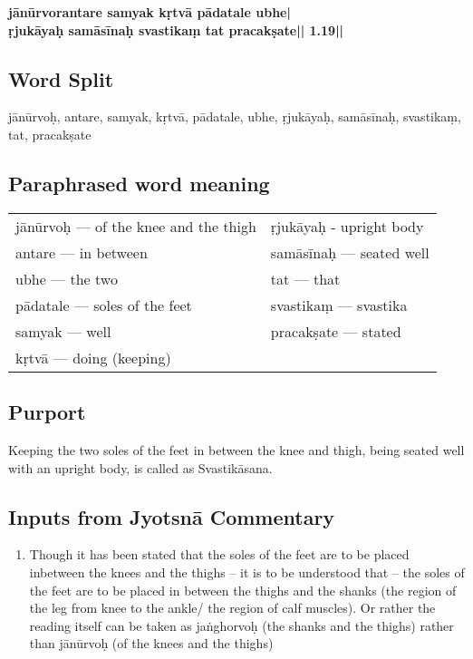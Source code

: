 \begin{shloka}
\textbf{jānūrvorantare samyak kṛtvā pādatale ubhe|}\\
\textbf{ṛjukāyaḥ samāsīnaḥ svastikaṃ tat pracakṣate|| 1.19||}
\end{shloka}

\subsection*{Word Split}

jānūrvoḥ, antare, samyak, kṛtvā, pādatale, ubhe, ṛjukāyaḥ, samāsīnaḥ, svastikaṃ, tat, pracakṣate
\vspace{-5pt}

\subsection*{Paraphrased word meaning}
\vspace{-10pt}

\begin{longtable}{>{\noindent\raggedright}p{5cm}>{\noindent\raggedright}p{5cm}}
jānūrvoḥ --- of the knee and the thigh & ṛjukāyaḥ - upright body\tabularnewline
antare --- in  between & samāsīnaḥ --- seated well\tabularnewline
ubhe --- the two & tat --- that\tabularnewline
pādatale --- soles of the feet & svastikaṃ --- svastika\tabularnewline
samyak --- well & pracakṣate --- stated\tabularnewline
kṛtvā --- doing (keeping) & 
\end{longtable}
\vspace{-5pt}

\subsection*{Purport}
\vspace{-10pt}

Keeping the two soles of the feet in between the knee and thigh, being seated well with an upright body, is called as Svastikāsana.

\subsection*{Inputs from Jyotsnā Commentary}

\begin{enumerate}
\item Though it has been stated that the soles of the feet are to be placed inbetween the knees and the thighs – it is to be understood that – the soles of the feet are to be placed in between the thighs and the shanks (the region of the leg from knee to the ankle/ the region of calf muscles). Or rather the reading itself can be taken as jaṅghorvoḥ (the shanks and the thighs) rather than jānūrvoḥ (of the knees and the thighs)
\end{enumerate}
\newpage

